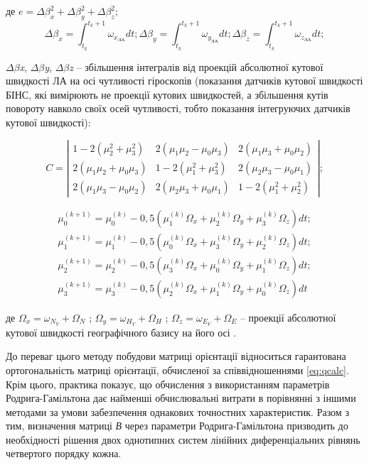 \begin{ESKDexplanation}
\item де   $e=\Delta \beta_{x}^{2} +\Delta \beta_{y}^{2} +\Delta \beta_{z}^{2} ;$
\[\Delta \beta_{x} =\int_{t_{k}}^{t_{k} +1}\omega_{x_{\text{ЛА}}} dt ;   
 \Delta \beta_{y} =\int_{t_{k}}^{t_{k} +1}\omega_{y_{\text{ЛА}}} dt ;   
 \Delta \beta_{z} =\int_{t_{k}}^{t_{k} +1}\omega_{z_{\text{ЛА}}} dt ;\] 

\item $\Delta $$\beta $\textit{x}, $\Delta $$\beta $\textit{y}, $\Delta $$\beta $\textit{z }-- збільшення 
інтегралів від проекцій абсолютної кутової швидкості ЛА на осі чутливості гіроскопів 
(показання датчиків кутової швидкості БІНС, які вимірюють не проекції кутових швидкостей, 
а збільшення кутів повороту навколо своїх осей чутливості, тобто показання інтегруючих 
датчиків кутової швидкості):
\end{ESKDexplanation}
\[C=\left|\begin{array}{ccc} 
{1-2(\mu_{2}^{2} +\mu_{3}^{2} )} & {2(\mu_{1} \mu_{2} -\mu_{0} \mu_{3} )} & {2(\mu_{1} \mu_{3} +\mu_{0} \mu_{2} )} \\ 
{2(\mu_{1} \mu_{2} +\mu_{0} \mu_{3} )} & {1-2(\mu_{1}^{2} +\mu_{3}^{2} )} & {2(\mu_{2} \mu_{3} -\mu_{0} \mu_{1} )} \\ 
{2(\mu_{1} \mu_{3} -\mu_{0} \mu_{2} )} & {2(\mu_{2} \mu_{3} +\mu_{0} \mu_{1} )} & {1-2(\mu_{1}^{2} +\mu_{2}^{2} )} 
\end{array}  \right|;\] 

\[\begin{array}{l} 
{\mu_{0}^{(k+1)}=\mu_{0}^{(k)} -0,5\left(\mu_{1}^{(k)} \Omega_{x} +\mu_{2}^{(k)} \Omega_{y}+\mu_{3}^{(k)} \Omega_{z} \right) dt;}\\ 
{\mu_{1}^{(k+1)}=\mu_{1}^{(k)} -0,5\left(\mu_{0}^{(k)} \Omega_{x} +\mu_{3}^{(k)} \Omega_{y}+\mu_{2}^{(k)} \Omega_{z} \right) dt;} \\ 
{\mu_{2}^{(k+1)}=\mu_{2}^{(k)} -0,5\left(\mu_{3}^{(k)} \Omega_{x} +\mu_{0}^{(k)} \Omega_{y}+\mu_{1}^{(k)} \Omega_{z} \right) dt;} \\ 
{\mu_{3}^{(k+1)}=\mu_{3}^{(k)} -0,5\left(\mu_{2}^{(k)} \Omega_{x} +\mu_{1}^{(k)} \Omega_{y} +\mu_{0}^{(k)} \Omega_{z} \right) dt} 
\end{array}\] 

\begin{ESKDexplanation}
\item де $\Omega_{x} =\omega_{N_{V}} +\Omega_{N}$ ;  $\Omega_{y} =\omega_{H_{V} 
} +\Omega_{H}$ ;  $\Omega_{z} =\omega_{E_{V}} +\Omega_{E} $ -- проекції абсолютної 
кутової швидкості географічного базису на його осі .
\end{ESKDexplanation}
До переваг цього методу побудови матриці орієнтації відноситься гарантована ортогональність 
матриці орієнтації, обчисленої за співвідношеннями \eqref{eq:qcalc}. Крім цього, 
практика показує, що обчислення з використанням параметрів Родрига-Гамільтона дає 
найменші обчислювальні витрати в порівнянні з іншими методами за умови забезпечення 
однакових точностних характеристик. Разом з тим, визначення матриці \textit{В }через 
параметри Родрига-Гамільтона призводить до необхідності рішення двох однотипних систем 
лінійних диференціальних рівнянь четвертого порядку кожна.

